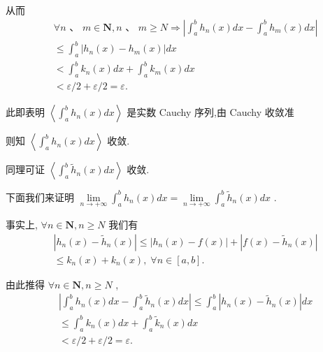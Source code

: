 从而
\begin{align*}
	&\forall n\text{ 、 }m \in  \mathbf{N},n\text{ 、 }m \geq  N \Rightarrow  \left| {{\int }_{a}^{b}{h}_{n}\left( x\right) {dx} - {\int }_{a}^{b}{h}_{m}\left( x\right) {dx}}\right|\\
	&\leq  {\int }_{a}^{b}\left| {{h}_{n}\left( x\right)  - {h}_{m}\left( x\right) }\right| {dx}\\
	&< {\int }_{a}^{b}{k}_{n}\left( x\right) {dx} + {\int }_{a}^{b}{k}_{m}\left( x\right) {dx}\\
	&< \varepsilon /2 + \varepsilon /2 = \varepsilon .
\end{align*}

此即表明 $\left\langle  {{\int }_{a}^{b}{h}_{n}\left( x\right) {dx}}\right\rangle$ 是实数 Cauchy 序列,由 Cauchy 收敛准

则知 $\left\langle  {{\int }_{a}^{b}{h}_{n}\left( x\right) {dx}}\right\rangle$ 收敛.

同理可证 $\left\langle  {{\int }_{a}^{b}{\widetilde{h}}_{n}\left( x\right) {dx}}\right\rangle$ 收敛.

下面我们来证明 $\mathop{\lim }\limits_{{n \rightarrow   + \infty }}{\int }_{a}^{b}{h}_{n}\left( x\right) {dx} = \mathop{\lim }\limits_{{n \rightarrow   + \infty }}{\int }_{a}^{b}{\widetilde{h}}_{n}\left( x\right) {dx}$ .

事实上, $\forall n \in  \mathbf{N},n \geq  N$ 我们有
\begin{align*}
	&\left| {{h}_{n}\left( x\right)  - {\widetilde{h}}_{n}\left( x\right) }\right|  \leq  \left| {{h}_{n}\left( x\right)  - f\left( x\right) }\right|  + \left| {f\left( x\right)  - {\widetilde{h}}_{n}\left( x\right) }\right|\\
	&\leq  {k}_{n}\left( x\right)  + {k}_{n}\left( x\right) ,\;\forall n \in  \left\lbrack  {a,b}\right\rbrack  .
\end{align*}

由此推得 $\forall n \in  \mathbf{N},n \geq  N$ ,
\begin{align*}
	&\left| {{\int }_{a}^{b}{h}_{n}\left( x\right) {dx} - {\int }_{a}^{b}{\widetilde{h}}_{n}\left( x\right) {dx}}\right|  \leq  {\int }_{a}^{b}\left| {{h}_{n}\left( x\right)  - {\widetilde{h}}_{n}\left( x\right) }\right| {dx}\\
	&\leq  {\int }_{a}^{b}{k}_{n}\left( x\right) {dx} + {\int }_{a}^{b}{\widetilde{k}}_{n}\left( x\right) {dx}\\
	&< \varepsilon /2 + \varepsilon /2 = \varepsilon .
\end{align*}

